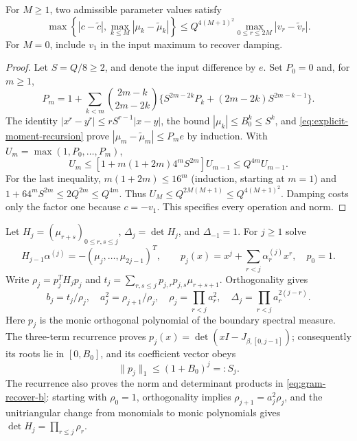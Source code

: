 \begin{lemma}
\label{lem:response-moment-triangularity}
For \(M\ge1\), two admissible parameter values satisfy
\begin{equation}
 \max\left\{|c-\widetilde c|,\max_{k\le M}|\mu_k-\widetilde\mu_k|\right\}
 \le Q^{4(M+1)^2}\max_{0\le r\le2M}|v_r-\widetilde v_r|.
 \label{eq:quantified-moment-map}
\end{equation}
For \(M=0\), include \(v_1\) in the input maximum to recover damping.
\end{lemma}
\begin{proof}
Let \(S=Q/8\ge2\), and denote the input difference by \(e\).
Set \(P_0=0\) and, for \(m\ge1\),
\[
 P_m=1+\sum_{k<m}\binom{2m-k}{2m-2k}
 \{S^{2m-2k}P_k+(2m-2k)S^{2m-k-1}\}.
\]
The identity \(|x^r-y^r|\le rS^{r-1}|x-y|\), the bound
\(|\mu_k|\le B_0^k\le S^k\), and \eqref{eq:explicit-moment-recursion}
prove \(|\mu_m-\widetilde\mu_m|\le P_me\) by induction.
With \(U_m=\max(1,P_0,\ldots,P_m)\),
\[
 U_m\le[1+m(1+2m)4^mS^{2m}]U_{m-1}\le Q^{4m}U_{m-1}.
\]
For the last inequality, \(m(1+2m)\le16^m\) (induction, starting at
\(m=1\)) and \(1+64^mS^{2m}\le2Q^{2m}\le Q^{4m}\).
Thus \(U_M\le Q^{2M(M+1)}\le Q^{4(M+1)^2}\). Damping costs only the
factor one because \(c=-v_1\). This specifies every operation and norm.
\end{proof}

Let \(H_j=(\mu_{r+s})_{0\le r,s\le j}\), \(\Delta_j=\det H_j\),
and \(\Delta_{-1}=1\). For \(j\ge1\) solve
\begin{equation}
 H_{j-1}\alpha^{(j)}=-(\mu_j,\ldots,\mu_{2j-1})^T,
 \qquad p_j(x)=x^j+\sum_{r<j}\alpha_r^{(j)}x^r,
 \quad p_0=1.
 \label{eq:gram-linear-system}
\end{equation}
Write \(\rho_j=p_j^TH_jp_j\) and
\(t_j=\sum_{r,s\le j}p_{j,r}p_{j,s}\mu_{r+s+1}\). Orthogonality gives
\begin{equation}
 b_j=t_j/\rho_j,\quad a_j^2=\rho_{j+1}/\rho_j,\quad
 \rho_j=\prod_{r<j}a_r^2,\quad
 \Delta_j=\prod_{r<j}a_r^{2(j-r)}.
 \label{eq:gram-recover-b}
\end{equation}
Here \(p_j\) is the monic orthogonal polynomial of the boundary spectral
measure. The three-term recurrence proves
\(p_j(x)=\det(xI-J_{\beta,[0,j-1]})\); consequently its roots lie in
\([0,B_0]\), and its coefficient vector obeys
\begin{equation}
 \|p_j\|_1\le (1+B_0)^j=:S_j.
 \label{eq:monic-coefficient-bound}
\end{equation}
The recurrence also proves the norm and determinant products in
\eqref{eq:gram-recover-b}: starting with \(\rho_0=1\), orthogonality
implies \(\rho_{j+1}=a_j^2\rho_j\), and the unitriangular change from
monomials to monic polynomials gives \(\det H_j=\prod_{r\le j}\rho_r\).


